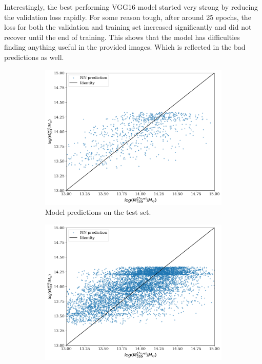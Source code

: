 Interestingly, the best performing VGG16 model started very strong by reducing the validation loss rapidly. For some reason tough, after around 25 epochs, the loss for both the validation and training set increased significantly and did not recover until the end of training. This shows that the model has difficulties finding anything useful in the provided images. Which is reflected in the bad predictions as well.

\begin{figure}[H]
\centering
\begin{subfigure}{.46\textwidth}
  \centering
  \includegraphics[width=\linewidth]{images/Chapter4/VGG16/vgg_pred_test.png}
  \caption{Model predictions on the test set.}
  \label{fig:best_perf_vgg16_a}
\end{subfigure}%
\hspace{.6em}
\begin{subfigure}{.46\textwidth}
  \centering
  \includegraphics[width=\linewidth]{images/Chapter4/VGG16/vgg_pred_train.png}

\end{subfigure}
\end{figure}
